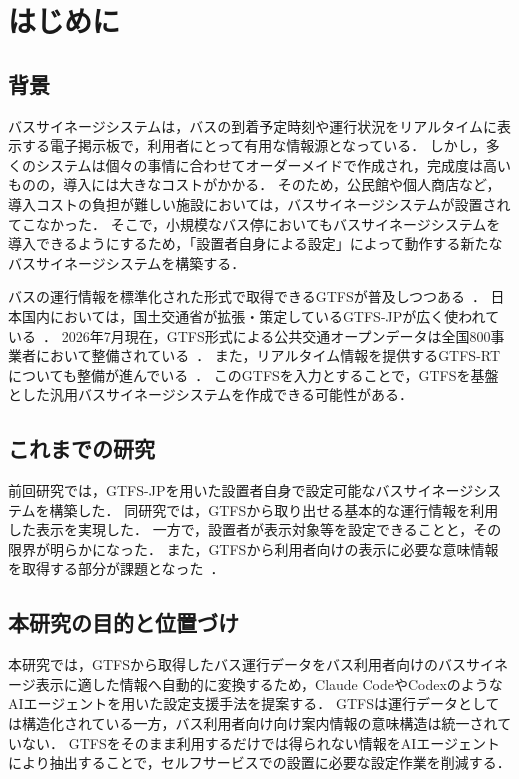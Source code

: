 \section{はじめに}
\subsection{背景}
バスサイネージシステムは，バスの到着予定時刻や運行状況をリアルタイムに表示する電子掲示板で，利用者にとって有用な情報源となっている．
しかし，多くのシステムは個々の事情に合わせてオーダーメイドで作成され，完成度は高いものの，導入には大きなコストがかかる．
そのため，公民館や個人商店など，導入コストの負担が難しい施設においては，バスサイネージシステムが設置されてこなかった．
そこで，小規模なバス停においてもバスサイネージシステムを導入できるようにするため，「設置者自身による設定」によって動作する新たなバスサイネージシステムを構築する．

バスの運行情報を標準化された形式で取得できるGTFSが普及しつつある~\cite{GTFS}．
日本国内においては，国土交通省が拡張・策定しているGTFS-JPが広く使われている~\cite{GTFSJPv4}．
2026年7月現在，GTFS形式による公共交通オープンデータは全国800事業者において整備されている~\cite{GTFSJPOpenDataMap}．
また，リアルタイム情報を提供するGTFS-RTについても整備が進んでいる~\cite{GTFSJPv4}．
このGTFSを入力とすることで，GTFSを基盤とした汎用バスサイネージシステムを作成できる可能性がある．

\subsection{これまでの研究}
前回研究では，GTFS-JPを用いた設置者自身で設定可能なバスサイネージシステムを構築した．
同研究では，GTFSから取り出せる基本的な運行情報を利用した表示を実現した．
一方で，設置者が表示対象等を設定できることと，その限界が明らかになった．
また，GTFSから利用者向けの表示に必要な意味情報を取得する部分が課題となった~\cite{oai:ipsj.ixsq.nii.ac.jp:02007105}．

\subsection{本研究の目的と位置づけ}
本研究では，GTFSから取得したバス運行データをバス利用者向けのバスサイネージ表示に適した情報へ自動的に変換するため，Claude CodeやCodexのようなAIエージェントを用いた設定支援手法を提案する．
GTFSは運行データとしては構造化されている一方，バス利用者向け向け案内情報の意味構造は統一されていない．
GTFSをそのまま利用するだけでは得られない情報をAIエージェントにより抽出することで，セルフサービスでの設置に必要な設定作業を削減する．

